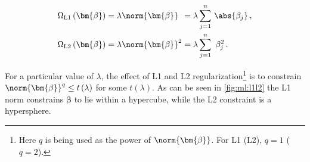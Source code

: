 \begin{subequations} \label{eq:L1_L2}
\begin{align}
\Omega_{\text{L1}}\left(\bm{\beta}\right) &= \lambda \norm{\bm{\beta}}\hphantom{^{1}}
= \lambda \sum_{j=1}^{n} \, \abs{\beta_{j}}\,, \label{eq:L1} \\
\Omega_{\text{L2}}\left(\bm{\beta}\right) &= \lambda \norm{\bm{\beta}}^{2}
= \lambda \sum_{j=1}^{n} \,\, \beta_{j}^{2}\,. \label{eq:L2}
\end{align}
\end{subequations}

For a particular value of $\lambda$, the effect of L1 and L2 regularization\footnote{Here
$q$ is being used as the power of $\norm{\bm{\beta}}$. For L1 (L2), $q=1$ ($q=2$).} is
to constrain $\norm{\bm{\beta}}^{q} \leq t\left(\lambda\right)$ for some $t\left(\lambda\right)$.
As can be seen in \cref{fig:ml:l1l2} the L1 norm constrains $\bm{\beta}$ to lie within a hypercube,
while the L2 constraint is a hypersphere.


